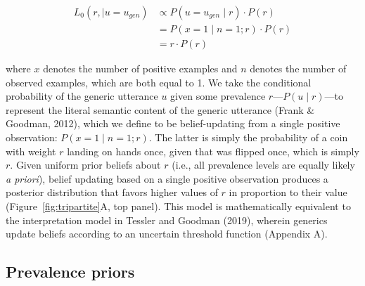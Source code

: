 \documentclass[floatsintext,doc]{apa6}
\begin{document}

\begin{align}
L_0(r, \mid u = u_{gen}) &\propto P(u = u_{gen} \mid r) \cdot P(r)  \nonumber \\
 &= P(x = 1 \mid n = 1; r) \cdot P(r) \nonumber \\
 &= r \cdot P(r) \label{eq:L0}
\end{align}

\noindent where \(x\) denotes the number of positive examples and \(n\) denotes the number of observed examples, which are both equal to 1.
We take the conditional probability of the generic utterance \(u\) given some prevalence \(r\)---\(P(u\mid r)\)---to represent the literal semantic content of the generic utterance (Frank \& Goodman, 2012), which we define to be belief-updating from a single positive observation: \(P(x =1 \mid n = 1; r)\).
The latter is simply the probability of a coin with weight \(r\) landing on hands once, given that was flipped once, which is simply \(r\).
Given uniform prior beliefs about $r$ (i.e., all prevalence levels are equally likely \emph{a priori}), belief updating based on a single positive observation produces a posterior distribution that favors higher values of $r$ in proportion to their value (Figure~\ref{fig:tripartite}A, top panel). 
This model is mathematically equivalent to the interpretation model in Tessler and Goodman (2019), wherein generics update beliefs according to an uncertain threshold function (Appendix A).

\subsection{Prevalence priors}
\end{document}
